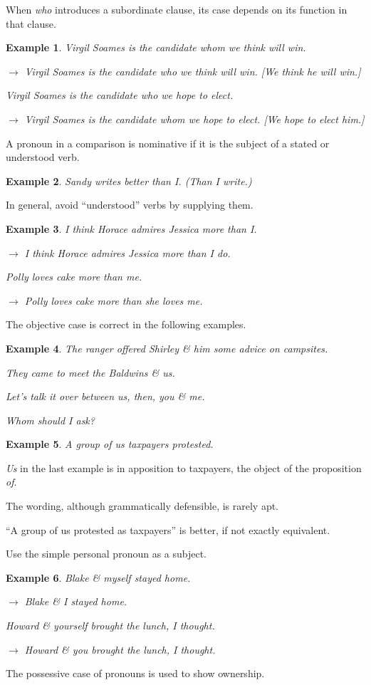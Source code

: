 \documentclass{article}
\newtheorem{example}{Example}
\begin{document}
When {\it who} introduces a subordinate clause, its case depends on its function in that clause.
\begin{example}
	Virgil Soames is the candidate whom we think will win.
	
	$\to$ Virgil Soames is the candidate who we think will win. [We think \emph{he} will win.]
	
	Virgil Soames is the candidate who we hope to elect.
	
	$\to$ Virgil Soames is the candidate whom we hope to elect. [We hope to elect \emph{him}.]
\end{example}
A pronoun in a comparison is nominative if it is the subject of a stated or understood verb.
\begin{example}
	Sandy writes better than I. (Than I write.)
\end{example}
In general, avoid ``understood'' verbs by supplying them.
\begin{example}
	I think Horace admires Jessica more than I.
	
	$\to$ I think Horace admires Jessica more than I do.
	
	Polly loves cake more than me.
	
	$\to$ Polly loves cake more than she loves me.
\end{example}
The objective case is correct in the following examples.
\begin{example}
	The ranger offered Shirley \& him some advice on campsites.
	
	They came to meet the Baldwins \& us.
	
	Let's talk it over between us, then, you \& me.
	
	Whom should I ask?
\end{example}

\begin{example}
	A group of us taxpayers protested.
\end{example}
{\it Us} in the last example is in apposition to taxpayers, the object of the proposition {\it of}.

The wording, although grammatically defensible, is rarely apt.

``A group of us protested as taxpayers'' is better, if not exactly equivalent.

%
Use the simple personal pronoun as a subject.
\begin{example}
	Blake \& myself stayed home.
	
	$\to$ Blake \& I stayed home.
	
	Howard \& yourself brought the lunch, I thought.
	
	$\to$ Howard \& you brought the lunch, I thought.
\end{example}
The possessive case of pronouns is used to show ownership.
\end{document}
